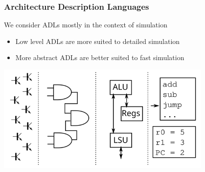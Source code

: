 \begin{frame}
\frametitle{Architecture Description Languages}

We consider ADLs mostly in the context of simulation
\begin{itemize}
	\item Low level ADLs are more suited to detailed simulation
	\item More abstract ADLs are better suited to fast simulation
\end{itemize}

\centering
\includegraphics[width=0.8\textwidth]{figures/adl-levels}

\end{frame}
